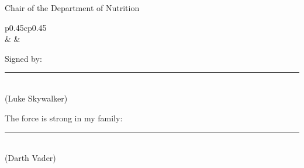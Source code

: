 \documentclass{article}
\begin{document}
\hspace*{0mm}\phantom{Approved: }Chair of the Department of Nutrition\\[1cm]


\begin{tabular}{p{0.45\textwidth}cp{0.45\textwidth}}
    \\
   & & 
\end{tabular}


\vfill  %
\noindent 
\parbox[b]{0.4\linewidth}{%
    \strut 
    Signed by: \\[2cm]%
    \rule{0.6\linewidth}{.4pt}\\
    (Luke Skywalker)} 
\hspace{1cm} %
\parbox[b]{0.4\linewidth}{%
    \strut 
    The force is strong in my family: \\[2cm]%
    \rule{0.6\linewidth}{.4pt}\\
    (Darth Vader)} 
    \par\vspace{1cm} 
\end{document}
